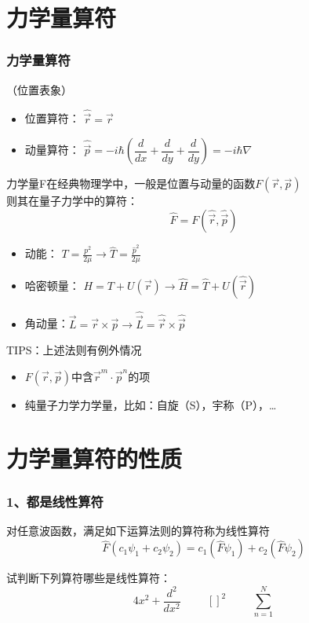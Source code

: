 \section{力学量算符}

\begin{frame} [allowframebreaks=]
    \frametitle{力学量算符}
    （位置表象）
    \begin{itemize}
        \item  位置算符： $ \hat{\vec{r}} =\vec{r} $
        \item  动量算符： $ \hat{\vec{p}} =-i\hbar(\dfrac{d}{d x}+ \dfrac{d}{d y} + \dfrac{d}{d y})=-i\hbar \nabla $
    \end{itemize}
    力学量F在经典物理学中，一般是位置与动量的函数$F(\vec{r},\vec{p})$\\
    则其在量子力学中的算符：$$ \hat{F}=F(\hat{\vec{r}},\hat{\vec{p}})$$
    \begin{exampleblock}{}
        \begin{itemize}
            \item  动能： $ T=\frac{p^2}{2\mu} \to \hat{T}= \frac{\hat{p}^2}{2\mu} $
            \item  哈密顿量： $ H=T+U(\vec{r} ) \to \hat{H}= \hat{T}+ U(\hat{\vec{r}})$
            \item  角动量：$ \vec{L}=\vec{r}\times\vec{p} \to \hat{\vec{L}}=\hat{\vec{r}}\times \hat{\vec{p}}$
        \end{itemize}
    \end{exampleblock}
\end{frame} 
\begin{frame}   
    TIPS：上述法则有例外情况
    \begin{itemize}
        \item  $F(\vec{r},\vec{p})$中含$\vec{r}^m\cdot\vec{p}^n$的项 
        \item  纯量子力学力学量，比如：自旋（S），宇称（P），\dots
    \end{itemize}
\end{frame} 

\section{力学量算符的性质}

\begin{frame} [allowframebreaks=]
    \frametitle{1、都是线性算符}
    \begin{definition}
        对任意波函数，满足如下运算法则的算符称为线性算符\\
        $$\hat{F}(c_1\psi_1+c_2\psi_2 ) = c_1(\hat{F}\psi_1)+c_2(\hat{F}\psi_2 )$$
    \end{definition}
    试判断下列算符哪些是线性算符：\\
    $$4x^2+\frac{d^2}{dx^2} \hspace{1cm}  []^2 \hspace{1cm} \sum\limits_{n=1}^{N}$$
\end{frame} 


